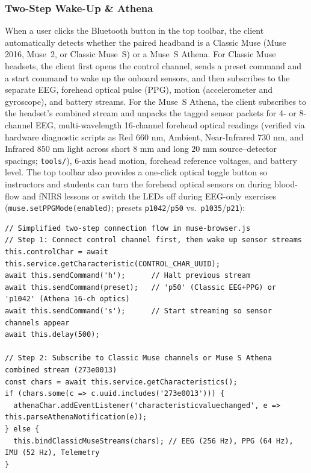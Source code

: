 \documentclass[11pt]{article}
\begin{document}
\subsubsection{Two-Step Wake-Up \& Athena}
When a user clicks the Bluetooth button in the top toolbar, the client automatically detects whether the paired headband is a Classic Muse (Muse 2016, Muse~2, or Classic Muse~S) or a Muse~S Athena. For Classic Muse headsets, the client first opens the control channel, sends a preset command and a start command to wake up the onboard sensors, and then subscribes to the separate EEG, forehead optical pulse (PPG), motion (accelerometer and gyroscope), and battery streams. For the Muse~S Athena, the client subscribes to the headset's combined stream and unpacks the tagged sensor packets for 4- or 8-channel EEG, multi-wavelength 16-channel forehead optical readings (verified via hardware diagnostic scripts as Red $660\text{ nm}$, Ambient, Near-Infrared $730\text{ nm}$, and Infrared $850\text{ nm}$ light across short $8\text{ mm}$ and long $20\text{ mm}$ source--detector spacings; \texttt{tools/}), 6-axis head motion, forehead reference voltages, and battery level. The top toolbar also provides a one-click optical toggle button so instructors and students can turn the forehead optical sensors on during blood-flow and fNIRS lessons or switch the LEDs off during EEG-only exercises (\texttt{muse.setPPGMode(enabled)}; presets \texttt{p1042}/\texttt{p50} vs.\ \texttt{p1035}/\texttt{p21}):

\noindent\begin{minipage}{\textwidth}
\begin{lstlisting}
// Simplified two-step connection flow in muse-browser.js
// Step 1: Connect control channel first, then wake up sensor streams
this.controlChar = await this.service.getCharacteristic(CONTROL_CHAR_UUID);
await this.sendCommand('h');      // Halt previous stream
await this.sendCommand(preset);   // 'p50' (Classic EEG+PPG) or 'p1042' (Athena 16-ch optics)
await this.sendCommand('s');      // Start streaming so sensor channels appear
await this.delay(500);

// Step 2: Subscribe to Classic Muse channels or Muse S Athena combined stream (273e0013)
const chars = await this.service.getCharacteristics();
if (chars.some(c => c.uuid.includes('273e0013'))) {
  athenaChar.addEventListener('characteristicvaluechanged', e => this.parseAthenaNotification(e));
} else {
  this.bindClassicMuseStreams(chars); // EEG (256 Hz), PPG (64 Hz), IMU (52 Hz), Telemetry
}
\end{lstlisting}
\end{minipage}
\vspace{4pt}
\end{document}
